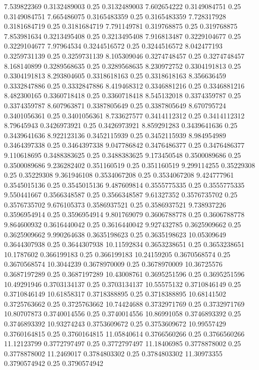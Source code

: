 {7.539822369 0.3132489003 0.25 0.3132489003
7.602654222 0.3149084751 0.25 0.3149084751
7.665486075 0.3165483359 0.25 0.3165483359
7.728317928 0.3181684719 0.25 0.3181684719
7.791149781 0.319768875 0.25 0.319768875
7.853981634 0.3213495408 0.25 0.3213495408
7.916813487 0.3229104677 0.25 0.3229104677
7.97964534 0.3244516572 0.25 0.3244516572
8.042477193 0.3259731139 0.25 0.3259731139
8.105309046 0.3274748457 0.25 0.3274748457
8.168140899 0.3289568635 0.25 0.3289568635
8.230972752 0.3304191813 0.25 0.3304191813
8.293804605 0.3318618163 0.25 0.3318618163
8.356636459 0.3332847886 0.25 0.3332847886
8.419468312 0.3346881216 0.25 0.3346881216
8.482300165 0.3360718418 0.25 0.3360718418
8.545132018 0.3374359787 0.25 0.3374359787
8.607963871 0.3387805649 0.25 0.3387805649
8.670795724 0.3401056361 0.25 0.3401056361
8.733627577 0.3414112312 0.25 0.3414112312
8.79645943 0.3426973921 0.25 0.3426973921
8.859291283 0.3439641636 0.25 0.3439641636
8.922123136 0.3452115939 0.25 0.3452115939
8.984954989 0.3464397338 0.25 0.3464397338
9.047786842 0.3476486377 0.25 0.3476486377
9.110618695 0.3488383625 0.25 0.3488383625
9.173450548 0.3500089686 0.25 0.3500089686
9.236282402 0.351160519 0.25 0.351160519
9.299114255 0.35229308 0.25 0.35229308
9.361946108 0.3534067208 0.25 0.3534067208
9.424777961 0.3545015136 0.25 0.3545015136
9.487609814 0.3555775335 0.25 0.3555775335
9.550441667 0.3566348587 0.25 0.3566348587
9.61327352 0.3576735702 0.25 0.3576735702
9.676105373 0.3586937521 0.25 0.3586937521
9.738937226 0.3596954914 0.25 0.3596954914
9.801769079 0.3606788778 0.25 0.3606788778
9.864600932 0.3616440042 0.25 0.3616440042
9.927432785 0.3625909662 0.25 0.3625909662
9.990264638 0.3635198623 0.25 0.3635198623
10.05309649 0.3644307938 0.25 0.3644307938
10.11592834 0.3653238651 0.25 0.3653238651
10.1787602 0.366199183 0.25 0.366199183
10.24159205 0.3670568574 0.25 0.3670568574
10.3044239 0.3678970009 0.25 0.3678970009
10.36725576 0.3687197289 0.25 0.3687197289
10.43008761 0.3695251596 0.25 0.3695251596
10.49291946 0.3703134137 0.25 0.3703134137
10.55575132 0.3710846149 0.25 0.3710846149
10.61858317 0.3718388895 0.25 0.3718388895
10.68141502 0.3725763662 0.25 0.3725763662
10.74424688 0.3732971769 0.25 0.3732971769
10.80707873 0.3740014556 0.25 0.3740014556
10.86991058 0.3746893392 0.25 0.3746893392
10.93274243 0.3753609672 0.25 0.3753609672
10.99557429 0.3760164815 0.25 0.3760164815
11.05840614 0.3766560266 0.25 0.3766560266
11.12123799 0.3772797497 0.25 0.3772797497
11.18406985 0.3778878002 0.25 0.3778878002
11.2469017 0.3784803302 0.25 0.3784803302
11.30973355 0.3790574942 0.25 0.3790574942
}
